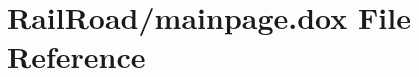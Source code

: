 \hypertarget{mainpage_8dox}{\section{Rail\-Road/mainpage.dox File Reference}
\label{mainpage_8dox}
}
